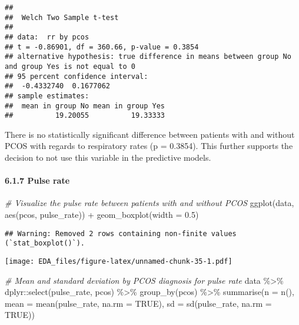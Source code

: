 \documentclass[
]{article}
\newenvironment{Shaded}{\begin{snugshade}}{\end{snugshade}}
\newcommand{\AttributeTok}[1]{\textcolor[rgb]{0.77,0.63,0.00}{#1}}
\newcommand{\CommentTok}[1]{\textcolor[rgb]{0.56,0.35,0.01}{\textit{#1}}}
\newcommand{\ConstantTok}[1]{\textcolor[rgb]{0.00,0.00,0.00}{#1}}
\newcommand{\FloatTok}[1]{\textcolor[rgb]{0.00,0.00,0.81}{#1}}
\newcommand{\FunctionTok}[1]{\textcolor[rgb]{0.00,0.00,0.00}{#1}}
\newcommand{\NormalTok}[1]{#1}
\newcommand{\SpecialCharTok}[1]{\textcolor[rgb]{0.00,0.00,0.00}{#1}}
\begin{document}
\begin{verbatim}
## 
##  Welch Two Sample t-test
## 
## data:  rr by pcos
## t = -0.86901, df = 360.66, p-value = 0.3854
## alternative hypothesis: true difference in means between group No and group Yes is not equal to 0
## 95 percent confidence interval:
##  -0.4332740  0.1677062
## sample estimates:
##  mean in group No mean in group Yes 
##          19.20055          19.33333
\end{verbatim}

There is no statistically significant difference between patients with
and without PCOS with regards to respiratory rates (p = 0.3854). This
further supports the decision to not use this variable in the predictive
models.

\hypertarget{pulse-rate-1}{%
\paragraph{6.1.7 Pulse rate}\label{pulse-rate-1}}

\begin{Shaded}
\begin{Highlighting}[]
\CommentTok{\# Visualize the pulse rate between patients with and without PCOS}
\FunctionTok{ggplot}\NormalTok{(data, }\FunctionTok{aes}\NormalTok{(pcos, pulse\_rate)) }\SpecialCharTok{+} \FunctionTok{geom\_boxplot}\NormalTok{(}\AttributeTok{width =} \FloatTok{0.5}\NormalTok{)}
\end{Highlighting}
\end{Shaded}

\begin{verbatim}
## Warning: Removed 2 rows containing non-finite values (`stat_boxplot()`).
\end{verbatim}

\texttt{[image: EDA\_files/figure-latex/unnamed-chunk-35-1.pdf]}

\begin{Shaded}
\begin{Highlighting}[]
\CommentTok{\# Mean and standard deviation by PCOS diagnosis for pulse rate}
\NormalTok{data }\SpecialCharTok{\%\textgreater{}\%}\NormalTok{ dplyr}\SpecialCharTok{::}\FunctionTok{select}\NormalTok{(pulse\_rate, pcos) }\SpecialCharTok{\%\textgreater{}\%} \FunctionTok{group\_by}\NormalTok{(pcos) }\SpecialCharTok{\%\textgreater{}\%} 
  \FunctionTok{summarise}\NormalTok{(}\AttributeTok{n =} \FunctionTok{n}\NormalTok{(), }
            \AttributeTok{mean =} \FunctionTok{mean}\NormalTok{(pulse\_rate, }\AttributeTok{na.rm =} \ConstantTok{TRUE}\NormalTok{), }
            \AttributeTok{sd =} \FunctionTok{sd}\NormalTok{(pulse\_rate, }\AttributeTok{na.rm =} \ConstantTok{TRUE}\NormalTok{))}
\end{Highlighting}
\end{Shaded}
\end{document}
